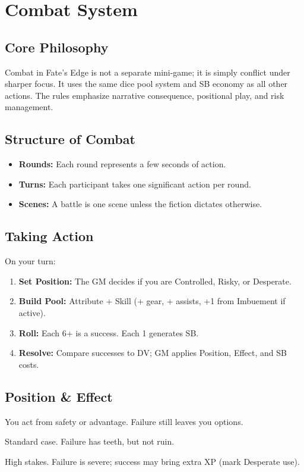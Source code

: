 
\section{Combat System}

\subsection{Core Philosophy}
Combat in Fate's Edge is not a separate mini-game; it is simply conflict under sharper focus. 
It uses the same dice pool system and SB economy as all other actions. 
The rules emphasize narrative consequence, positional play, and risk management.

\subsection{Structure of Combat}
\begin{itemize}
  \item \textbf{Rounds:} Each round represents a few seconds of action.
  \item \textbf{Turns:} Each participant takes one significant action per round.
  \item \textbf{Scenes:} A battle is one scene unless the fiction dictates otherwise.
\end{itemize}

\subsection{Taking Action}
On your turn:
\begin{enumerate}
  \item \textbf{Set Position:} The GM decides if you are Controlled, Risky, or Desperate.
  \item \textbf{Build Pool:} Attribute + Skill (+ gear, + assists, +1 from Imbuement if active).
  \item \textbf{Roll:} Each 6+ is a success. Each 1 generates SB.
  \item \textbf{Resolve:} Compare successes to DV; GM applies Position, Effect, and SB costs.
\end{enumerate}

\subsection{Position \& Effect}
\begin{description}[leftmargin=1.5em]
  \item[Controlled] You act from safety or advantage. Failure still leaves you options.
  \item[Risky] Standard case. Failure has teeth, but not ruin.
  \item[Desperate] High stakes. Failure is severe; success may bring extra XP (mark Desperate use).
\end{description}


